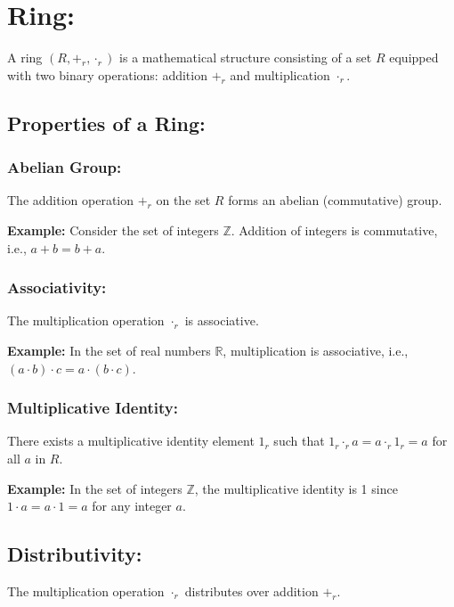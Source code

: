 \documentclass[11pt]{article}
\begin{document}
\section{Ring:}

A ring \( (R, +_r, \cdot_r) \) is a mathematical structure consisting of a set \( R \) equipped with two binary operations: addition \( +_r \) and multiplication \( \cdot_r \).

\subsection{Properties of a Ring:}

\subsubsection{Abelian Group:}

The addition operation \( +_r \) on the set \( R \) forms an abelian (commutative) group.

\textbf{Example:} Consider the set of integers \( \mathbb{Z} \). Addition of integers is commutative, i.e., \( a + b = b + a \).

\subsubsection{Associativity:}

The multiplication operation \( \cdot_r \) is associative.

\textbf{Example:} In the set of real numbers \( \mathbb{R} \), multiplication is associative, i.e., \( (a \cdot b) \cdot c = a \cdot (b \cdot c) \).

\subsubsection{Multiplicative Identity:}

There exists a multiplicative identity element \( 1_r \) such that \( 1_r \cdot_r a = a \cdot_r 1_r = a \) for all \( a \) in \( R \).

\textbf{Example:} In the set of integers \( \mathbb{Z} \), the multiplicative identity is 1 since \( 1 \cdot a = a \cdot 1 = a \) for any integer \( a \).

\subsection{Distributivity:}

The multiplication operation \( \cdot_r \) distributes over addition \( +_r \).
\end{document}
